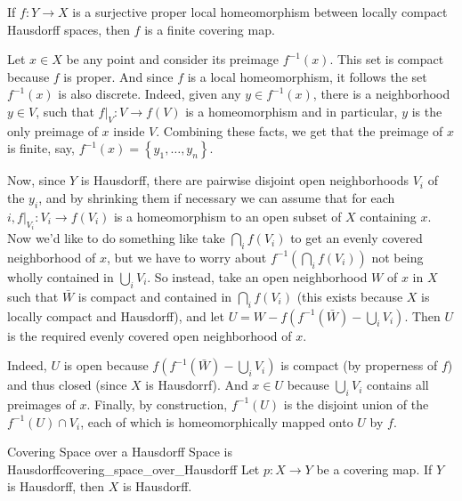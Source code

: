\documentclass{report}
\begin{document}
\begin{proposition}{}{}
	If $f: Y \rightarrow X$ is a surjective proper local homeomorphism between locally compact Hausdorff spaces, then $f$ is a finite covering map.
\end{proposition}
\begin{prf}
	Let $x \in X$ be any point and consider its preimage $f^{-1}(x)$. This set is compact because $f$ is proper. And since $f$ is a local homeomorphism, it follows the set $f^{-1}(x)$ is also discrete. Indeed, given any $y \in f^{-1}(x)$, there is a neighborhood $y \in V$, such that $\left.f\right|_V: V \rightarrow f(V)$ is a homeomorphism and in particular, $y$ is the only preimage of $x$ inside $V$. Combining these facts, we get that the preimage of $x$ is finite, say, $f^{-1}(x)=\left\{y_1, \ldots, y_n\right\}$.

	Now, since $Y$ is Hausdorff, there are pairwise disjoint open neighborhoods $V_i$ of the $y_i$, and by shrinking them if necessary we can assume that for each $i,\left.f\right|_{V_i}: V_i \rightarrow f\left(V_i\right)$ is a homeomorphism to an open subset of $X$ containing $x$. Now we'd like to do something like take $\bigcap_i f\left(V_i\right)$ to get an evenly covered neighborhood of $x$, but we have to worry about $f^{-1}\left(\bigcap_i f\left(V_i\right)\right)$ not being wholly contained in $\bigcup_i V_i$. So instead, take an open neighborhood $W$ of $x$ in $X$ such that $\bar{W}$ is compact and contained in $\bigcap_i f\left(V_i\right)$ (this exists because $X$ is locally compact and Hausdorff), and let $U=W -f\left(f^{-1}(\bar{W}) - \bigcup_i V_i\right)$. Then $U$ is the required evenly covered open neighborhood of $x$.

	Indeed, $U$ is open because $f\left(f^{-1}(\bar{W}) -\bigcup_i V_i\right)$ is compact (by properness of $f$) and thus closed (since $X$ is Hausdorrf). And $x \in U$ because $\bigcup_i V_i$ contains all preimages of $x$. Finally, by construction, $f^{-1}(U)$ is the disjoint union of the $f^{-1}(U) \cap V_i$, each of which is homeomorphically mapped onto $U$ by $f$.
\end{prf}

\begin{proposition}{Covering Space over a Hausdorff Space is Hausdorff}{covering_space_over_Hausdorff}
	Let \(p:X\to Y\) be a covering map. If \(Y\) is Hausdorff, then \(X\) is Hausdorff.
\end{proposition}
\end{document}
